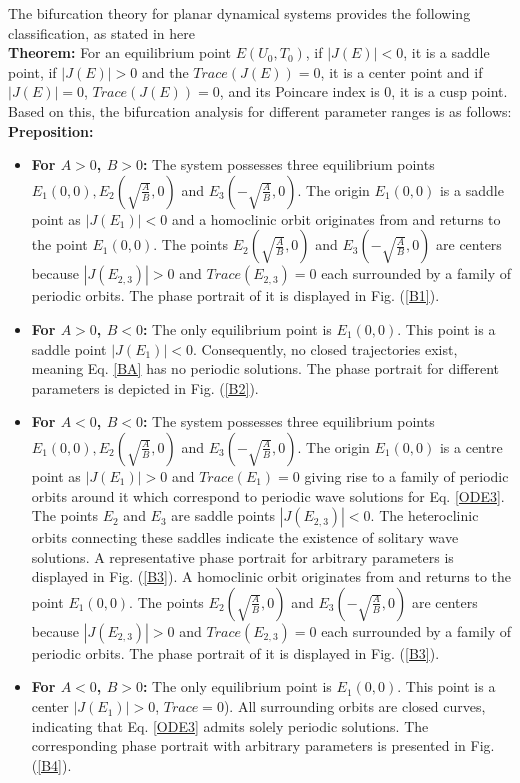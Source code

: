 \documentclass{article}
\numberwithin{equation}{section}
\begin{document}
\noindent
\newpage
The bifurcation theory for planar dynamical systems provides the following classification, as stated in here\\
\textbf{Theorem:} For an equilibrium point $E(U_{0}, T_{0})$, if $|J(E)| < 0$, it is a saddle point, if $|J(E)| > 0$ and the $Trace(J(E)) = 0$, it is a center point and if $|J(E)| = 0$, $Trace(J(E)) = 0$, and its Poincare index is $0$, it is a cusp point.\\
Based on this, the bifurcation analysis for different parameter ranges is as follows:\\
\textbf{Preposition:}
\begin{itemize}
  \item \textbf{For $A > 0$, $B > 0$:} The system possesses three equilibrium points $E_{1}(0, 0), E_{2}(\sqrt{\frac{A}{B}},0)$ and $E_{3}(-\sqrt{\frac{A}{B}}, 0)$. The origin $E_{1}(0, 0)$ is a saddle point as $|J(E_{1})| < 0$ and a homoclinic orbit originates from and returns to the point $E_{1}(0, 0)$. The points $E_{2}(\sqrt{\frac{A}{B}},0)$ and $E_{3}(-\sqrt{\frac{A}{B}}, 0)$ are centers because $|J(E_{2,3})| > 0$ and $Trace(E_{2,3})=0$ each surrounded by a family of periodic orbits. The phase portrait of it is displayed in Fig. (\ref{B1}).
  \item \textbf{For $A > 0$, $B < 0$:} The only equilibrium point is $E_{1}(0, 0)$. This point is a saddle point $|J(E_{1})| < 0$. Consequently, no closed trajectories exist, meaning Eq. \ref{BA} has no periodic solutions. The phase portrait for different parameters is depicted in Fig. (\ref{B2}).
  \item \textbf{For $A < 0$, $B < 0$:} The system possesses three equilibrium points $E_{1}(0, 0), E_{2}(\sqrt{\frac{A}{B}},0)$ and $E_{3}(-\sqrt{\frac{A}{B}}, 0)$. The origin $E_{1}(0, 0)$ is a centre point as $|J(E_{1})| > 0$ and $Trace(E_{1})=0$ giving rise to a family of periodic orbits around it which correspond to periodic wave solutions for Eq. \ref{ODE3}. The points $E_{2}$ and $E_{3}$ are saddle points $|J(E_{2,3})| < 0$. The heteroclinic orbits connecting these saddles indicate the existence of solitary wave solutions. A representative phase portrait for arbitrary parameters is displayed in Fig. (\ref{B3}). A homoclinic orbit originates from and returns to the point $E_{1}(0, 0)$. The points $E_{2}(\sqrt{\frac{A}{B}},0)$ and $E_{3}(-\sqrt{\frac{A}{B}}, 0)$ are centers because $|J(E_{2,3})| > 0$ and $Trace(E_{2,3})=0$ each surrounded by a family of periodic orbits. The phase portrait of it is displayed in Fig. (\ref{B3}).
  \item \textbf{For $A < 0$, $B > 0$:} The only equilibrium point is $E_{1}(0, 0)$. This point is a center $|J(E_{1})| > 0$, $Trace=0$). All surrounding orbits are closed curves, indicating that Eq. \ref{ODE3} admits solely periodic solutions. The corresponding phase portrait with arbitrary parameters is presented in Fig. (\ref{B4}).
\end{itemize}
\end{document}
